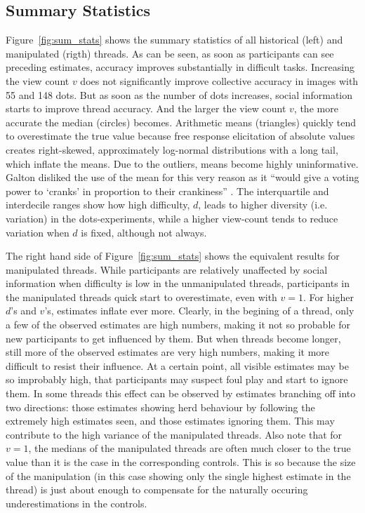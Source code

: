 \documentclass[9pt,twoside,lineno]{pnas-new}
\begin{document}
\subsection*{Summary Statistics}
Figure~\ref{fig:sum_stats} shows the summary statistics of all historical (left) and manipulated (rigth) threads. As can be seen, as soon as participants can see preceding estimates, accuracy improves substantially in difficult tasks. Increasing the view count $v$ does not significantly improve collective accuracy in images with 55 and 148 dots. But as soon as the number of dots increases, social information starts to improve thread accuracy. And the larger the view count $v$, the more accurate the median (circles) becomes. Arithmetic means (triangles) quickly tend to overestimate the true value because free response elicitation of absolute values creates right-skewed, approximately log-normal distributions with a long tail, which inflate the means. Due to the outliers, means become highly uninformative. Galton disliked the use of the mean for this very reason as it “would give a voting power to ‘cranks’ in proportion to their crankiness” \cite{galton1907vox}. The interquartile and interdecile ranges show how high difficulty, $d$, leads to higher diversity (i.e. variation) in the dots-experiments, while a higher view-count tends to reduce variation when $d$ is fixed, although not always.

The right hand side of Figure~\ref{fig:sum_stats} shows the equivalent results for manipulated threads. While participants are relatively unaffected by social information when difficulty is low in the unmanipulated threads, participants in the manipulated threads quick start to overestimate, even with $v=1$. For higher $d$'s and $v$'s, estimates inflate ever more. Clearly, in the begining of a thread, only a few of the observed estimates are high numbers, making it not so probable for new participants to get influenced by them. But when threads become longer, still more of the observed estimates are very high numbers, making it more difficult to resist their influence. At a certain point, all visible estimates may be so improbably high, that participants may suspect foul play and start to ignore them. In some threads this effect can be observed by estimates branching off into two directions: those estimates showing herd behaviour by following the extremely high estimates seen, and those estimates ignoring them. This may contribute to the high variance of the manipulated threads. Also note that for $v=1$, the medians of the manipulated threads are often much closer to the true value than it is the case in the corresponding controls. This is so because the size of the manipulation (in this case showing only the single highest estimate in the thread) is just about enough to compensate for the naturally occuring underestimations in the controls.
\end{document}
